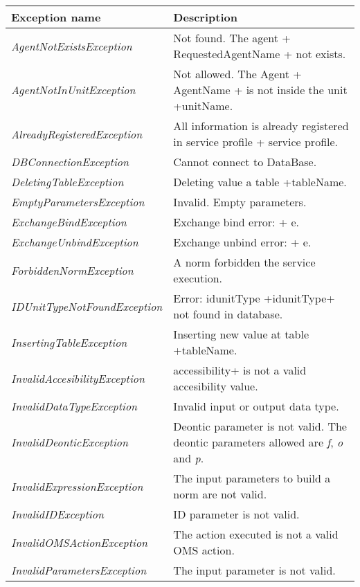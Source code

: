 \begin{longtable}{|p{6.5cm}|p{7.2cm}|}
\hline
  \textbf{Exception name} & \textbf{Description} \\ \endhead \hline
  \emph{AgentNotExistsException} & Not found. The agent + RequestedAgentName +  not exists. \\ \hline
  \emph{AgentNotInUnitException} & Not allowed. The Agent + AgentName +  is not inside the unit +unitName. \\ \hline
  \emph{AlreadyRegisteredException} & All information is already registered in service profile + service profile. \\ \hline
  \emph{DBConnectionException} & Cannot connect to DataBase. \\ \hline
  \emph{DeletingTableException} & Deleting value a table +tableName. \\ \hline
  \emph{EmptyParametersException} & Invalid. Empty parameters. \\ \hline
  \emph{ExchangeBindException} & Exchange bind error: + e. \\ \hline
  \emph{ExchangeUnbindException} & Exchange unbind error: + e. \\ \hline
  \emph{ForbiddenNormException} & A norm forbidden the service execution.\\ \hline
  \emph{IDUnitTypeNotFoundException} & Error: idunitType +idunitType+ not found in database. \\ \hline
  \emph{InsertingTableException} & Inserting new value at table +tableName. \\ \hline
  \emph{InvalidAccesibilityException} & accessibility+ is not a valid accesibility value. \\ \hline
  \emph{InvalidDataTypeException} & Invalid input or output data type. \\ \hline
  \emph{InvalidDeonticException} & Deontic parameter is not valid. The deontic parameters allowed are \textit{f}, \textit{o} and \textit{p}. \\ \hline
  \emph{InvalidExpressionException} & The input parameters to build a norm are not valid. \\ \hline
  \emph{InvalidIDException} & ID parameter is not valid. \\ \hline
  \emph{InvalidOMSActionException} & The action executed is not a valid OMS action. \\ \hline
  \emph{InvalidParametersException} & The input parameter is not valid. \\ \hline

\end{longtable}
